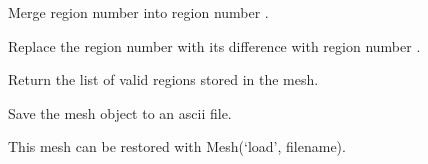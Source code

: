 \documentclass[a4paper,11pt,english]{sphinxmanual}
\begin{document}
\begin{fulllineitems}
\begin{fulllineitems}
\end{fulllineitems}


\begin{fulllineitems}
\label{\detokenize{python/cmdref_Mesh:getfem.Mesh.region_merge}}
Merge region number  into region number .

\end{fulllineitems}


\begin{fulllineitems}
\label{\detokenize{python/cmdref_Mesh:getfem.Mesh.region_subtract}}
Replace the region number  with its difference with region
number .

\end{fulllineitems}


\begin{fulllineitems}
\label{\detokenize{python/cmdref_Mesh:getfem.Mesh.regions}}
Return the list of valid regions stored in the mesh.

\end{fulllineitems}


\begin{fulllineitems}
\label{\detokenize{python/cmdref_Mesh:getfem.Mesh.save}}
Save the mesh object to an ascii file.

This mesh can be restored with Mesh(‘load’, filename).

\end{fulllineitems}



\end{fulllineitems}
\end{document}
